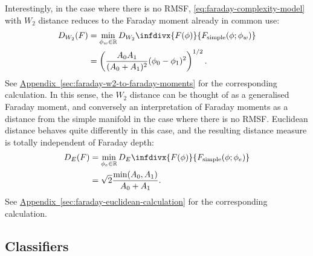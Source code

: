 \documentclass[11pt, a4paper]{book}
\newcommand{\aref}[1]{\hyperref[#1]{Appendix~\ref{#1}}}
\providecommand{\DIFaddbegin}{} %
\providecommand{\DIFaddend}{} %
\providecommand{\DIFdelbegin}{} %
\providecommand{\DIFdelend}{} %
\newcommand{\DIFscaledelfig}{0.5}
\newlength{\DIFdelgraphicswidth} %
\newlength{\DIFdelgraphicsheight} %
\newcommand{\DIFaddincludegraphics}[2][]{{\color{blue}\fbox{\DIFOincludegraphics[#1]{#2}}}} %
\newcommand{\DIFdelincludegraphics}[2][]{%
\sbox{\DIFdelgraphicsbox}{\DIFOincludegraphics[#1]{#2}}%
\settoboxwidth{\DIFdelgraphicswidth}{\DIFdelgraphicsbox} %
\settoboxtotalheight{\DIFdelgraphicsheight}{\DIFdelgraphicsbox} %
\scalebox{\DIFscaledelfig}{%
\parbox[b]{\DIFdelgraphicswidth}{\usebox{\DIFdelgraphicsbox}\\[-\baselineskip] \rule{\DIFdelgraphicswidth}{0em}}\llap{\resizebox{\DIFdelgraphicswidth}{\DIFdelgraphicsheight}{%
\setlength{\unitlength}{\DIFdelgraphicswidth}%
\begin{picture}(1,1)%
\thicklines\linethickness{2pt} %
{\color[rgb]{1,0,0}\put(0,0){\framebox(1,1){}}}%
{\color[rgb]{1,0,0}\put(0,0){\line( 1,1){1}}}%
{\color[rgb]{1,0,0}\put(0,1){\line(1,-1){1}}}%
\end{picture}%
}\hspace*{3pt}}} %
} %
\DeclareRobustCommand{\DIFaddbegin}{\DIFOaddbegin \let\includegraphics\DIFaddincludegraphics} %
\DeclareRobustCommand{\DIFaddend}{\DIFOaddend \let\includegraphics\DIFOincludegraphics} %
\DeclareRobustCommand{\DIFdelbegin}{\DIFOdelbegin \let\includegraphics\DIFdelincludegraphics} %
\DeclareRobustCommand{\DIFdelend}{\DIFOaddend \let\includegraphics\DIFOincludegraphics} %
\begin{document}
    Interestingly, in the case where there is no RMSF, \autoref{eq:faraday-complexity-model} with $W_2$ distance reduces to the Faraday moment already in common use:
    \begin{align}
        D_{W_2}(F) &= \min_{\phi_w \in \mathbb{R}} D_{W_2}\infdivx{F(\phi)}{F_{\mathrm{simple}}(\phi; \phi_w)}\label{eq:faraday-W2-distance}\\
            &= \left(\frac{A_0A_1}{(A_0 + A_1)^2} (\phi_0 - \phi_1)^2\right)^{1/2}.
    \end{align}
    See \DIFdelbegin %
\DIFdelend \DIFaddbegin \aref{sec:faraday-w2-to-faraday-moments} \DIFaddend for the corresponding calculation. In this sense, the $W_2$ distance can be thought of as a generalised Faraday moment, and conversely an interpretation of Faraday moments as a distance from the simple manifold in the case where there is no RMSF. Euclidean distance behaves quite differently in this case, and the resulting distance measure is totally independent of Faraday depth:
    \begin{align}
        D_{E}(F) &= \min_{\phi_e \in \mathbb{R}} D_E\infdivx{F(\phi)}{F_{\mathrm{simple}}(\phi; \phi_e)}\label{eq:faraday-Euclidean-distance}\\
            &= \sqrt{2} \frac{\min(A_0, A_1)}{A_0 + A_1}.
    \end{align}
    See \aref{sec:faraday-euclidean-calculation} for the corresponding calculation.


  \subsection{Classifiers}
  \label{sec:faraday-classifiers}
\end{document}
